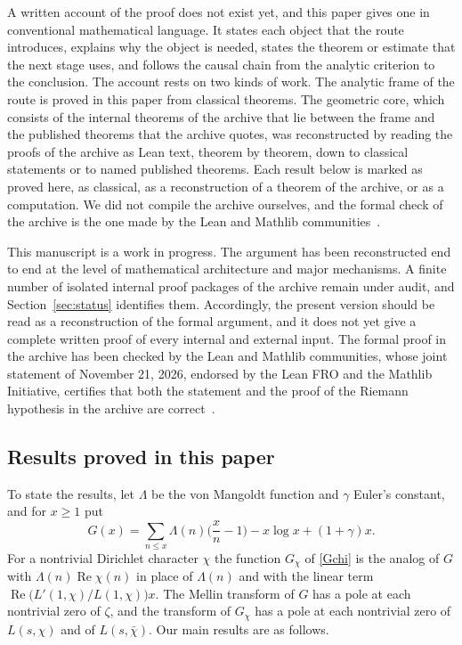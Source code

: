 \documentclass[11pt,letterpaper]{article}
\numberwithin{equation}{section}
\begin{document}
A written account of the proof does not exist yet, and this paper gives one in conventional mathematical language. It states each object that the route introduces, explains why the object is needed, states the theorem or estimate that the next stage uses, and follows the causal chain from the analytic criterion to the conclusion. The account rests on two kinds of work. The analytic frame of the route is proved in this paper from classical theorems. The geometric core, which consists of the internal theorems of the archive that lie between the frame and the published theorems that the archive quotes, was reconstructed by reading the proofs of the archive as Lean text, theorem by theorem, down to classical statements or to named published theorems. Each result below is marked as proved here, as classical, as a reconstruction of a theorem of the archive, or as a computation. We did not compile the archive ourselves, and the formal check of the archive is the one made by the Lean and Mathlib communities~\cite{leanstatement}.

This manuscript is a work in progress. The argument has been reconstructed end to end at the level of mathematical architecture and major mechanisms. A finite number of isolated internal proof packages of the archive remain under audit, and Section~\ref{sec:status} identifies them. Accordingly, the present version should be read as a reconstruction of the formal argument, and it does not yet give a complete written proof of every internal and external input. The formal proof in the archive has been checked by the Lean and Mathlib communities, whose joint statement of November 21, 2026, endorsed by the Lean FRO and the Mathlib Initiative, certifies that both the statement and the proof of the Riemann hypothesis in the archive are correct~\cite{leanstatement}.

\subsection{Results proved in this paper}\label{sec:results}

To state the results, let $\Lambda$ be the von Mangoldt function and $\gamma$ Euler's constant, and for $x\ge1$ put
\[
G(x)=\sum_{n\le x}\Lambda(n)\Big(\frac xn-1\Big)-x\log x+(1+\gamma)x .
\]
For a nontrivial Dirichlet character $\chi$ the function $G_\chi$ of \eqref{Gchi} is the analog of $G$ with $\Lambda(n)\operatorname{Re}\chi(n)$ in place of $\Lambda(n)$ and with the linear term $\operatorname{Re}\big(L'(1,\chi)/L(1,\chi)\big)x$. The Mellin transform of $G$ has a pole at each nontrivial zero of $\zeta$, and the transform of $G_\chi$ has a pole at each nontrivial zero of $L(s,\chi)$ and of $L(s,\bar\chi)$. Our main results are as follows.
\end{document}

